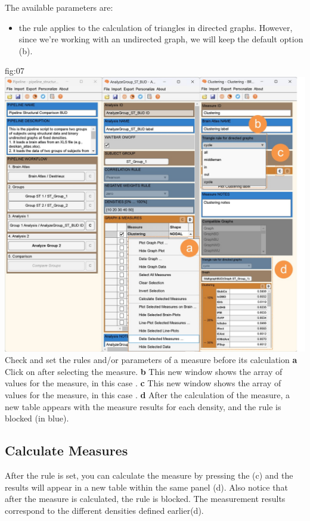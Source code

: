 \documentclass[justified]{tufte-handout}
\begin{document}
 The available parameters are:
 \begin{itemize}
 
 \item {} the rule applies to the calculation of triangles in directed graphs. However, since we're working with an undirected graph, we will keep the default option (b).
 
 \end{itemize}
 
 	{fig:07}
 	{\includegraphics{fig07.jpg}}
	{Check and set the rules and/or parameters of a measure before its calculation}
 	{
 	{\bf a} Click on  after selecting the measure.
 	{\bf b} This new window shows the array of values for the measure, in this case .
 	{\bf c} This new window shows the array of values for the measure, in this case .
 	{\bf d} After the calculation of the measure, a new table appears with the measure results for each density, and the rule is blocked (in blue).
 	}
 
 
\subsection{Calculate Measures}

After the rule is set, you can calculate the measure by pressing the  (c) and the results will appear in a new table within the same panel (d). Also notice that after the measure is calculated, the rule is blocked. The measurement results correspond to the different densities defined earlier(d).
 
\end{document}
